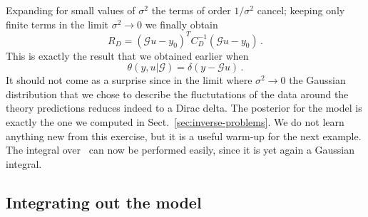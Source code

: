 Expanding for small values of $\sigma^2$ the terms of order $1/\sigma^2$ cancel;
keeping only finite terms in the limit $\sigma^2 \to 0$ we finally obtain
\begin{equation}
    \label{eq:RDAfterLimit}
    R_D = \left(\mathcal{G}u - y_0\right)^T C_D^{-1}
    \left(\mathcal{G}u - y_0\right)\, .
\end{equation}
This is exactly the result that we obtained earlier when 
\begin{equation}
    \label{eq:RemindTheta}
    \theta(y,u|\mathcal{G}) = \delta(y-\mathcal{G}u)\, .
\end{equation}
It should not come as a surprise since in the limit where $\sigma^2 \to 0$ the
Gaussian distribution that we chose to describe the fluctutations of the data
around the theory predictions reduces indeed to a Dirac delta. The posterior for
the model is exactly the one we computed in Sect.~\ref{sec:inverse-problems}. We
do not learn anything new from this exercise, but it is a useful warm-up for the
next example. The integral over \obs\ can now be performed easily, since it is
yet again a Gaussian integral. 


\subsection{Integrating out the model}
\label{eq:IntModOut}

